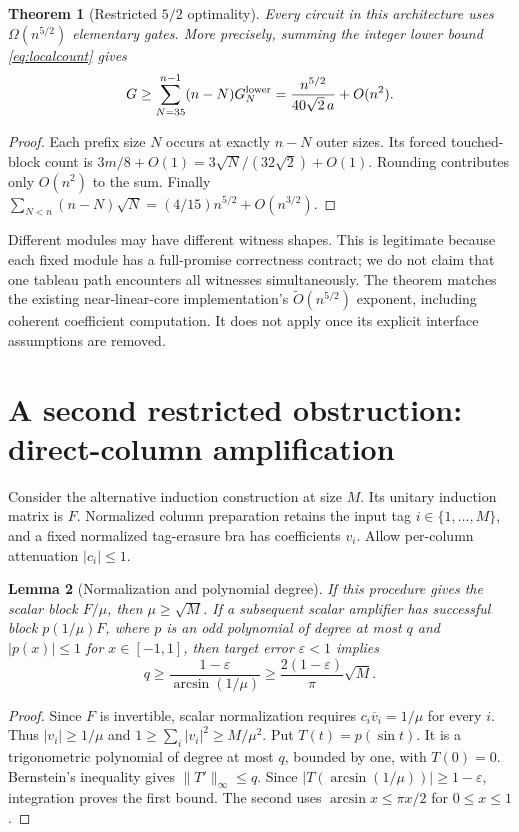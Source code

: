 \documentclass[11pt]{article}
\newtheorem{theorem}{Theorem}
\newtheorem{lemma}[theorem]{Lemma}
\theoremstyle{definition}
\newcommand{\norm}[1]{\lVert #1\rVert}
\begin{document}
\begin{theorem}[Restricted $5/2$ optimality]\label{thm:stream}
Every circuit in this architecture uses $\Omega(n^{5/2})$ elementary
gates. More precisely, summing the integer lower bound
\eqref{eq:localcount} gives
\[
 G\ge\sum_{N=35}^{n-1}(n-N)G_N^{\rm lower}
 =\frac{n^{5/2}}{40\sqrt2\,a}+O(n^2).
\]
\end{theorem}
\begin{proof}
Each prefix size $N$ occurs at exactly $n-N$ outer sizes. Its forced
touched-block count is $3m/8+O(1)=3\sqrt N/(32\sqrt2)+O(1)$.
Rounding contributes only $O(n^2)$ to the sum. Finally
$\sum_{N<n}(n-N)\sqrt N=(4/15)n^{5/2}+O(n^{3/2})$.
\end{proof}

Different modules may have different witness shapes. This is legitimate
because each fixed module has a full-promise correctness contract; we do
not claim that one tableau path encounters all witnesses simultaneously.
The theorem matches the existing near-linear-core implementation's
$\widetilde O(n^{5/2})$ exponent, including coherent coefficient computation.
It does not apply once its explicit interface assumptions are removed.

\section{A second restricted obstruction: direct-column amplification}

Consider the alternative induction construction at size $M$. Its unitary
induction matrix is $F$. Normalized column preparation retains the input
tag $i\in\{1,\ldots,M\}$, and a fixed normalized tag-erasure bra has
coefficients $v_i$. Allow per-column attenuation $|c_i|\le1$.

\begin{lemma}[Normalization and polynomial degree]\label{lem:poly}
If this procedure gives the scalar block $F/\mu$, then $\mu\ge\sqrt M$.
If a subsequent scalar amplifier has successful block $p(1/\mu)F$,
where $p$ is an odd polynomial of degree at most $q$ and
$|p(x)|\le1$ for $x\in[-1,1]$, then target error $\varepsilon<1$ implies
\[
 q\ge\frac{1-\varepsilon}{\arcsin(1/\mu)}
 \ge\frac{2(1-\varepsilon)}\pi\sqrt M.
\]
\end{lemma}
\begin{proof}
Since $F$ is invertible, scalar normalization requires
$c_i\overline v_i=1/\mu$ for every $i$. Thus $|v_i|\ge1/\mu$ and
$1\ge\sum_i|v_i|^2\ge M/\mu^2$.
Put $T(t)=p(\sin t)$. It is a trigonometric polynomial of degree at most
$q$, bounded by one, with $T(0)=0$. Bernstein's inequality
\cite[Theorem 1.1]{Bernstein} gives $\norm{T'}_\infty\le q$.
Since $|T(\arcsin(1/\mu))|\ge1-\varepsilon$, integration proves the
first bound. The second uses $\arcsin x\le\pi x/2$ for $0\le x\le1$.
\end{proof}
\end{document}
